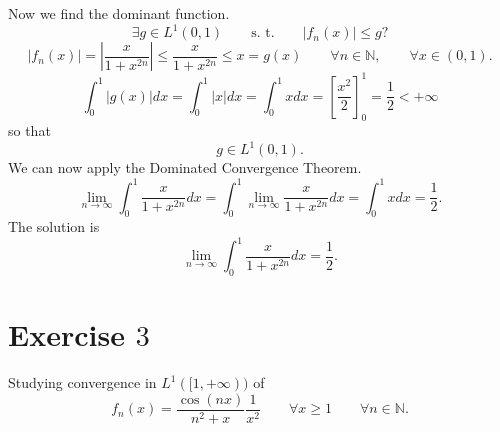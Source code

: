 \documentclass[a4paper, twoside, openany]{book}
\begin{document}
Now we find the dominant function.
$$\exists g \in L^1(0, 1) \qquad \textrm{s. t.} \qquad |f_n(x)| \leq g?$$
$$|f_n(x)| = |\frac{x}{1 + x^{2n}}| \leq \frac{x}{1 + x^{2n}} \leq x = g(x) \qquad \forall n \in \mathbb{N}, \qquad \forall x \in (0, 1).$$
$$\int_0^1 |g(x)| dx = \int_0^1 |x| dx = \int_0^1 x dx = [ \frac{x^2}{2}]_0^1 = \frac{1}{2} < +\infty$$
so that
$$g \in L^1(0,1).$$
We can now apply the Dominated Convergence Theorem.
$$\lim_{n \rightarrow \infty} \int_0^1 \frac{x}{1 + x^{2n}} dx = \int_0^1 \lim_{n \rightarrow \infty} \frac{x}{1 + x^{2n}} dx = \int_0^1 x dx = \frac{1}{2}.$$
The solution is
$$\lim_{n \rightarrow \infty} \int_0^1 \frac{x}{1 + x^{2n}} dx = \frac{1}{2}.$$
\section*{Exercise $3$}
Studying convergence in $L^1([1, +\infty))$ of
$$f_n(x) = \frac{\cos(nx)}{n^2 + x} \frac{1}{x^2} \qquad \forall x \geq 1 \qquad \forall n \in \mathbb{N}.$$
\end{document}
